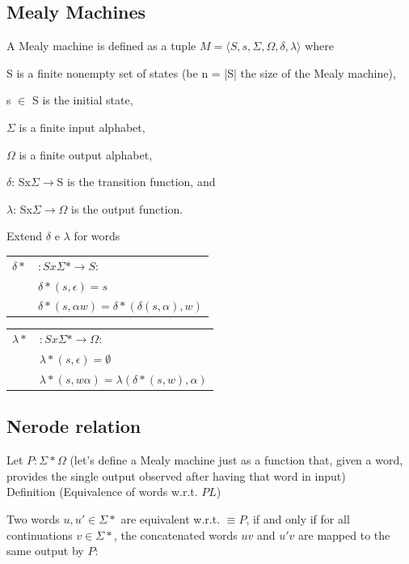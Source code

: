 \subsection{Mealy Machines}
A Mealy machine is defined as a tuple $M = \langle S, s, \Sigma, \Omega, \delta, \lambda\rangle$ where
\begin{itemize*}
	\item S is a finite nonempty set of states (be n = |S| the size of the Mealy machine),
	\item s $\in$ S is the initial state,
	\item $\Sigma$ is a finite input alphabet,
	\item $\Omega$ is a finite output alphabet,
	\item $\delta$: Sx$\Sigma\rightarrow$S is the transition function, and
	\item $\lambda$: Sx$\Sigma\rightarrow\Omega$ is the output function.
\end{itemize*}

Extend $\delta$ e $\lambda$ for words\\

\begin{tabular}{cl}
	$\delta*$ & $: Sx\Sigma * \rightarrow S$: \\ 
	& $\delta* (s,\epsilon)= s$\\ 
	& $\delta* (s, \alpha w) = \delta * (\delta(s,  \alpha), w)$ 
\end{tabular}

\begin{tabular}{cl}	
	$\lambda*$ & $: Sx\Sigma * \rightarrow\Omega$:\\
	& $\lambda* (s,\epsilon)=\emptyset$\\
	& $\lambda* (s, w\alpha) = \lambda(\delta * (s, w), \alpha)$
\end{tabular} 

\subsection{Nerode relation}

Let $P:\Sigma*\Omega$ {\tiny (let’s define a Mealy machine just as a function that, given a word, provides the single output observed after having that word in input)}\\


Definition (Equivalence of words w.r.t. $PL$)


Two words $u,u' \in \Sigma*$ are equivalent w.r.t. $\equiv P$, if and only if for all continuations $v \in \Sigma*$, the concatenated words $uv$ and $u'v$ are mapped to the same output by $P$:

